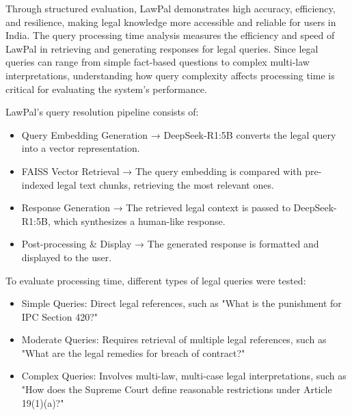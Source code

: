 Through structured evaluation, LawPal demonstrates high accuracy, efficiency, and resilience, making legal knowledge more accessible and reliable for users in India. The query processing time analysis measures the efficiency and speed of LawPal in retrieving and generating responses for legal queries. Since legal queries can range from simple fact-based questions to complex multi-law interpretations, understanding how query complexity affects processing time is critical for evaluating the system’s performance.


LawPal’s query resolution pipeline consists of:
\begin{itemize}
    \item Query Embedding Generation → DeepSeek-R1:5B converts the legal query into a vector representation.
\end{itemize}
\begin{itemize}
    \item FAISS Vector Retrieval → The query embedding is compared with pre-indexed legal text chunks, retrieving the most relevant ones.
\end{itemize}
\begin{itemize}
    \item Response Generation → The retrieved legal context is passed to DeepSeek-R1:5B, which synthesizes a human-like response.
\end{itemize}
\begin{itemize}
    \item Post-processing \& Display → The generated response is formatted and displayed to the user.
\end{itemize}

To evaluate processing time, different types of legal queries were tested:
\begin{itemize}
    \item Simple Queries: Direct legal references, such as "What is the punishment for IPC Section 420?"
\end{itemize}
\begin{itemize}
    \item Moderate Queries: Requires retrieval of multiple legal references, such as "What are the legal remedies for breach of contract?"
\end{itemize}
\begin{itemize}
    \item Complex Queries: Involves multi-law, multi-case legal interpretations, such as "How does the Supreme Court define reasonable restrictions under Article 19(1)(a)?"
\end{itemize}

